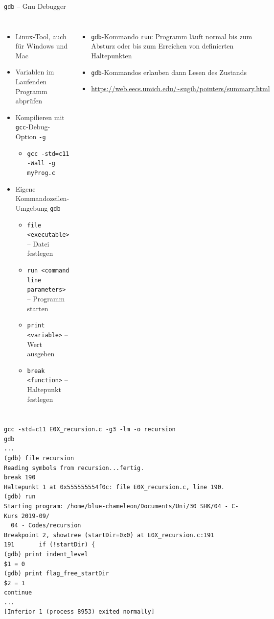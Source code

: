 \begin{frame}{\texttt{gdb} -- Gnu Debugger}
%
\begin{columns}[T]
\begin{itemize}
\item Linux-Tool, auch für Windows und Mac
\item Variablen im Laufenden Programm abprüfen
\item Kompilieren mit \texttt{gcc}-Debug-Option \texttt{-g}
	\begin{itemize}
	\item \texttt{gcc -std=c11 -Wall -g myProg.c}
	\end{itemize}
\item Eigene Kommandozeilen-Umgebung \texttt{gdb}
	\begin{itemize}
	\item \texttt{file <executable>} -- Datei festlegen
	\item \texttt{run <command line parameters>} -- Programm starten
	\item \texttt{print <variable>} -- Wert ausgeben
	\item \texttt{break <function>} -- Haltepunkt festlegen
	\end{itemize}
\end{itemize}
%
\begin{itemize}
\item \texttt{gdb}-Kommando \texttt{run}: Programm läuft normal bis zum Absturz oder bis zum Erreichen
	von definierten Haltepunkten
\item \texttt{gdb}-Kommandos erlauben dann Lesen des Zustands
\item \url{https://web.eecs.umich.edu/~sugih/pointers/summary.html}
\end{itemize}
\end{columns}
%
\end{frame}


\begin{frame}[fragile]
%
\begin{cmdbox}
\begin{verbatim}
gcc -std=c11 E0X_recursion.c -g3 -lm -o recursion
gdb
...
(gdb) file recursion
Reading symbols from recursion...fertig.
break 190
Haltepunkt 1 at 0x555555554f0c: file E0X_recursion.c, line 190.
(gdb) run
Starting program: /home/blue-chameleon/Documents/Uni/30 SHK/04 - C-Kurs 2019-09/
  04 - Codes/recursion
Breakpoint 2, showtree (startDir=0x0) at E0X_recursion.c:191
191       if (!startDir) {
(gdb) print indent_level
$1 = 0
(gdb) print flag_free_startDir
$2 = 1
continue
...
[Inferior 1 (process 8953) exited normally]
\end{verbatim}
\end{cmdbox}
%
\end{frame}

